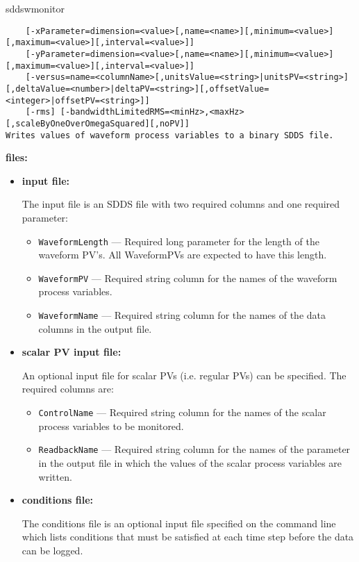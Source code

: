 \begin{sddsprog}{sddswmonitor}
\begin{verbatim}
    [-xParameter=dimension=<value>[,name=<name>][,minimum=<value>][,maximum=<value>][,interval=<value>]]
    [-yParameter=dimension=<value>[,name=<name>][,minimum=<value>][,maximum=<value>][,interval=<value>]]
    [-versus=name=<columnName>[,unitsValue=<string>|unitsPV=<string>][,deltaValue=<number>|deltaPV=<string>][,offsetValue=<integer>|offsetPV=<string>]]
    [-rms] [-bandwidthLimitedRMS=<minHz>,<maxHz>[,scaleByOneOverOmegaSquared][,noPV]]
Writes values of waveform process variables to a binary SDDS file.
\end{verbatim}
\item \textbf{files:}
\begin{itemize}
\item \textbf{input file:}\par
The input file is an SDDS file with two required columns and one required parameter:
\begin{itemize}
        \item {\verb+WaveformLength+} --- Required long parameter for the length of the waveform PV's. All
                WaveformPVs are expected to have this length. 
        \item {\verb+WaveformPV+}  --- Required string column for the names of the waveform process variables.
        \item {\verb+WaveformName+} --- Required string column for the names of the data columns in the output file.
\end{itemize}

\item \textbf{scalar PV input file:}\par
An optional input file for scalar PVs (i.e. regular PVs) can be specified. The required columns are:
\begin{itemize}
        \item {\tt ControlName} --- Required string column for the names of the scalar process variables
                to be monitored.
        \item {\tt ReadbackName} --- Required string column for the names of the parameter in the 
                output file in which the values of the scalar process variables are written.
\end{itemize}

\item \textbf{conditions file:} \par
The conditions file is an optional input file specified on the command line which lists
conditions that must be satisfied at each time step before the data can be logged.


\end{itemize}
\end{sddsprog}
